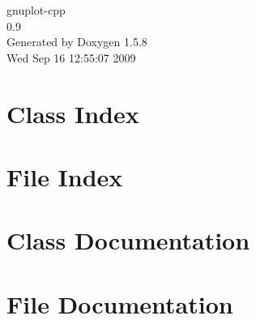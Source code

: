 \documentclass[a4paper]{book}
\begin{document}
\begin{titlepage}
\vspace*{7cm}
\begin{center}
{\Large gnuplot-cpp \\[1ex]\large 0.9 }\\
\vspace*{1cm}
{\large Generated by Doxygen 1.5.8}\\
\vspace*{0.5cm}
{\small Wed Sep 16 12:55:07 2009}\\
\end{center}
\end{titlepage}
\clearemptydoublepage
{}
\tableofcontents
\clearemptydoublepage
{}
\chapter{Class Index}

\chapter{File Index}

\chapter{Class Documentation}


\chapter{File Documentation}


\printindex
\end{document}
